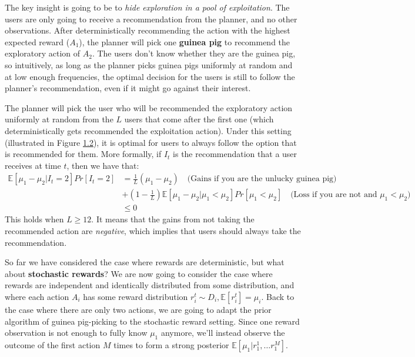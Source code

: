 \documentclass[
  letterpaper,
  numbers=noenddot,
  DIV=11]{scrreprt}
\theoremstyle{definition}
\theoremstyle{plain}
\theoremstyle{plain}
\theoremstyle{remark}
\begin{document}
The key insight is going to be to \emph{hide exploration in a pool of
exploitation}. The users are only going to receive a recommendation from
the planner, and no other observations. After deterministically
recommending the action with the highest expected reward (\(A_1\)), the
planner will pick one \textbf{guinea pig} to recommend the exploratory
action of \(A_2\). The users don't know whether they are the guinea pig,
so intuitively, as long as the planner picks guinea pigs uniformly at
random and at low enough frequencies, the optimal decision for the users
is still to follow the planner's recommendation, even if it might go
against their interest.

The planner will pick the user who will be recommended the exploratory
action uniformly at random from the \(L\) users that come after the
first one (which deterministically gets recommended the exploitation
action). Under this setting (illustrated in Figure
\hyperref[fig-deterministic-guinea-pig]{1.2}), it is optimal for users
to always follow the option that is recommended for them. More formally,
if \(I_t\) is the recommendation that a user receives at time \(t\),
then we have that: \[\begin{split}
    \mathbb{E}[\mu_1 - \mu_2 | I_t = 2] Pr[I_t = 2] &= \frac{1}{L} (\mu_1 - \mu_2) \quad \text{(Gains if you are the unlucky guinea pig)}\\
    &+ (1 - \frac{1}{L}) \mathbb{E}[\mu_1 - \mu_2 | \mu_1 < \mu_2] Pr[\mu_1 < \mu_2] \quad \text{(Loss if you are not and $\mu_1 < \mu_2$)}\\
    &\leq 0
\end{split}\] This holds when \(L \geq 12\). It means that the gains
from not taking the recommended action are \emph{negative}, which
implies that users should always take the recommendation.

So far we have considered the case where rewards are deterministic, but
what about \textbf{stochastic rewards}? We are now going to consider the
case where rewards are independent and identically distributed from some
distribution, and where each action \(A_i\) has some reward distribution
\(r_i^t \sim D_i, \mathbb{E}[r_i^t] = \mu_i\). Back to the case where
there are only two actions, we are going to adapt the prior algorithm of
guinea pig-picking to the stochastic reward setting. Since one reward
observation is not enough to fully know \(\mu_1\) anymore, we'll instead
observe the outcome of the first action \(M\) times to form a strong
posterior \(\mathbb{E}[\mu_1 | r_1^1, \ldots r_1^M]\).
\end{document}
